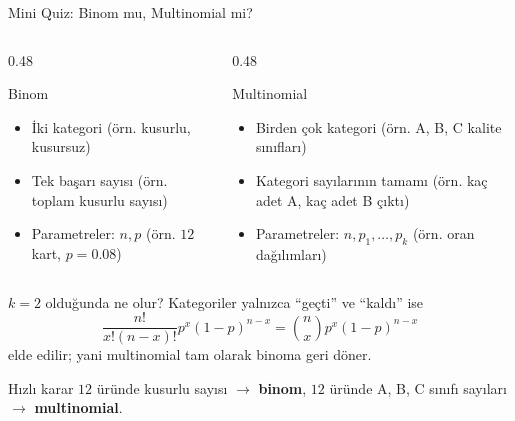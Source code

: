 \documentclass[light]{lutbeamer}
\begin{document}
\begin{frame}{Mini Quiz: Binom mu, Multinomial mi?}
    \scriptsize
    \begin{columns}[T]
        \begin{column}{0.48\textwidth}
            \begin{block}{Binom}
                \begin{itemize}
                    \item İki kategori (örn. kusurlu, kusursuz)
                    \item Tek başarı sayısı (örn. toplam kusurlu sayısı)
                    \item Parametreler: \(n,p\) (örn. \(12\) kart, \(p=0.08\))
                \end{itemize}
            \end{block}
        \end{column}
        \begin{column}{0.48\textwidth}
            \begin{block}{Multinomial}
                \begin{itemize}
                    \item Birden çok kategori (örn. A, B, C kalite sınıfları)
                    \item Kategori sayılarının tamamı (örn. kaç adet A, kaç adet B çıktı)
                    \item Parametreler: \(n,p_1,\dots,p_k\) (örn. oran dağılımları)
                \end{itemize}
            \end{block}
        \end{column}
    \end{columns}

    \begin{exampleblock}{\(k=2\) olduğunda ne olur?}
        Kategoriler yalnızca ``geçti'' ve ``kaldı'' ise
        \[
        \frac{n!}{x!(n-x)!}p^x(1-p)^{n-x}
        =\binom{n}{x}p^x(1-p)^{n-x}
        \]
        elde edilir; yani multinomial tam olarak binoma geri döner.
    \end{exampleblock}

    \begin{block}{Hızlı karar}
        \(12\) üründe kusurlu sayısı \(\rightarrow\) \textbf{binom},
        \(12\) üründe A, B, C sınıfı sayıları \(\rightarrow\) \textbf{multinomial}.
    \end{block}
\end{frame}
\end{document}
